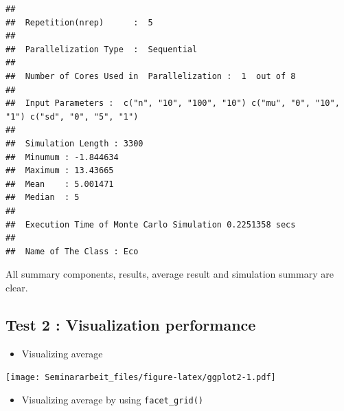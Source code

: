 \documentclass[11pt,a4paper]{article}
\newenvironment{Shaded}{\begin{snugshade}}{\end{snugshade}}
\newcommand{\AttributeTok}[1]{\textcolor[rgb]{0.77,0.63,0.00}{#1}}
\newcommand{\FunctionTok}[1]{\textcolor[rgb]{0.00,0.00,0.00}{#1}}
\newcommand{\NormalTok}[1]{#1}
\newcommand{\SpecialCharTok}[1]{\textcolor[rgb]{0.00,0.00,0.00}{#1}}
\begin{document}
\begin{verbatim}
## 
##  Repetition(nrep)      :  5 
## 
##  Parallelization Type  :  Sequential 
## 
##  Number of Cores Used in  Parallelization :  1  out of 8 
## 
##  Input Parameters :  c("n", "10", "100", "10") c("mu", "0", "10", "1") c("sd", "0", "5", "1") 
## 
##  Simulation Length : 3300 
##  Minumum : -1.844634 
##  Maximum : 13.43665 
##  Mean    : 5.001471 
##  Median  : 5 
## 
##  Execution Time of Monte Carlo Simulation 0.2251358 secs 
## 
##  Name of The Class : Eco
\end{verbatim}

All summary components, results, average result and simulation summary
are clear.

\hypertarget{test-2-visualization-performance}{%
\subsection{Test 2 : Visualization
performance}\label{test-2-visualization-performance}}

\begin{itemize}

\item
  Visualizing average
\end{itemize}

\begin{Shaded}
\end{Shaded}

\texttt{[image: Seminararbeit\_files/figure-latex/ggplot2-1.pdf]}

\begin{itemize}

\item
  Visualizing average by using \texttt{facet\_grid()}
\end{itemize}

\begin{Shaded}
\end{Shaded}
\end{document}
